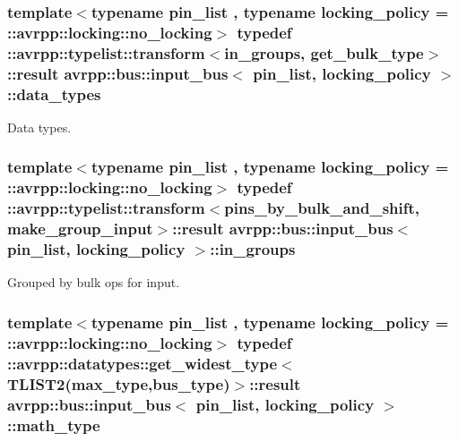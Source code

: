 \hypertarget{structavrpp_1_1bus_1_1input__bus_ac1c2ce93ef8e3f3408ea57355d8aa139}{
\subsubsection[{data\_\-types}]{\setlength{\rightskip}{0pt plus 5cm}template$<$typename pin\_\-list , typename locking\_\-policy  = ::avrpp::locking::no\_\-locking$>$ typedef ::avrpp::typelist::transform$<${\bf in\_\-groups}, {\bf get\_\-bulk\_\-type}$>$::result {\bf avrpp::bus::input\_\-bus}$<$ pin\_\-list, locking\_\-policy $>$::{\bf data\_\-types}}}
\label{structavrpp_1_1bus_1_1input__bus_ac1c2ce93ef8e3f3408ea57355d8aa139}


Data types. 

\hypertarget{structavrpp_1_1bus_1_1input__bus_a5615071616dcadcc6d365c8b8354f537}{
\subsubsection[{in\_\-groups}]{\setlength{\rightskip}{0pt plus 5cm}template$<$typename pin\_\-list , typename locking\_\-policy  = ::avrpp::locking::no\_\-locking$>$ typedef ::avrpp::typelist::transform$<${\bf pins\_\-by\_\-bulk\_\-and\_\-shift}, {\bf make\_\-group\_\-input}$>$::result {\bf avrpp::bus::input\_\-bus}$<$ pin\_\-list, locking\_\-policy $>$::{\bf in\_\-groups}}}
\label{structavrpp_1_1bus_1_1input__bus_a5615071616dcadcc6d365c8b8354f537}


Grouped by bulk ops for input. 

\hypertarget{structavrpp_1_1bus_1_1input__bus_a52d5d0ce7a0d4e34127230d80cfece76}{
\subsubsection[{math\_\-type}]{\setlength{\rightskip}{0pt plus 5cm}template$<$typename pin\_\-list , typename locking\_\-policy  = ::avrpp::locking::no\_\-locking$>$ typedef ::avrpp::datatypes::get\_\-widest\_\-type$<$TLIST2({\bf max\_\-type},{\bf bus\_\-type})$>$::result {\bf avrpp::bus::input\_\-bus}$<$ pin\_\-list, locking\_\-policy $>$::{\bf math\_\-type}}}
\label{structavrpp_1_1bus_1_1input__bus_a52d5d0ce7a0d4e34127230d80cfece76}


